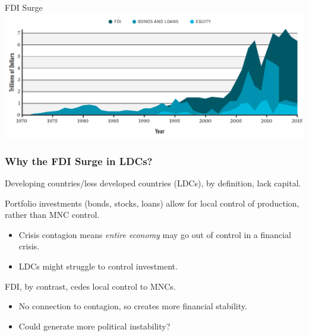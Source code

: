 \documentclass[handout]{beamer}
\begin{document}
\begin{frame}{\LARGE FDI Surge}
	\centering
	\includegraphics[width=\textwidth,height=0.8\textheight,keepaspectratio]{invest.png}
\end{frame}

\begin{frame} 
	\frametitle{\LARGE{Why the FDI Surge in LDCs?}}
	\begin{itemize}
		\large{
			\item Developing countries/less developed countries (LDCs), by definition, lack capital. \pause 
			\item Portfolio investments (bonds, stocks, loans) allow for local control of production, rather than MNC control. \pause 
			\begin{itemize}
				\item Crisis contagion means \textit{entire economy} may go out of control in a financial crisis. \pause  
				\item LDCs might struggle to control investment. \pause 
			\end{itemize}
			\item FDI, by contrast, cedes local control to MNCs. \pause 
			\begin{itemize}
				\item No connection to contagion, so creates more financial stability. \pause 
				\item Could generate more political instability?
			\end{itemize}
		}
	\end{itemize}
\end{frame}



		
\end{document}
